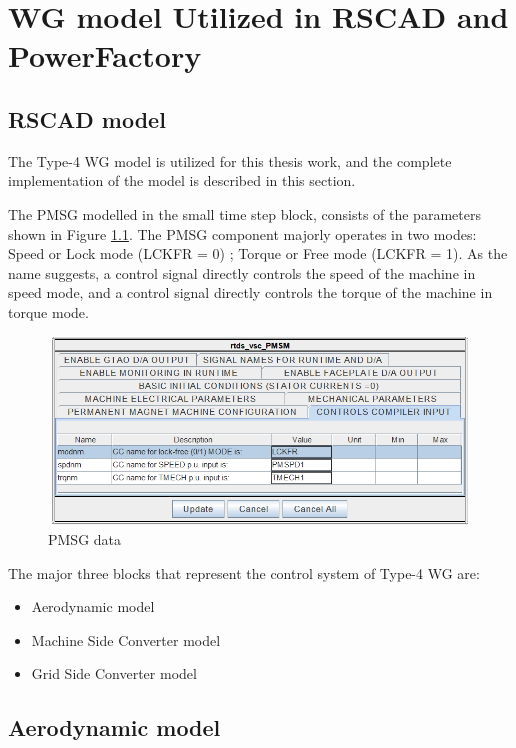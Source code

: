 \chapter{WG model Utilized in RSCAD and PowerFactory}\label{Appendix_A}

\section{RSCAD model}

The Type-4 \gls{WG} model is utilized for this thesis work, and the complete implementation of the model is described in this section. 

The \gls{PMSG} modelled in the small time step block, consists of the parameters shown in Figure \ref{fig:PMSG_block_para}. The \gls{PMSG} component majorly operates in two modes: Speed or Lock mode (LCKFR = 0) ; Torque or Free mode (LCKFR = 1).
As the name suggests, a control signal directly controls the speed of the machine in speed mode, and a control signal directly controls the torque of the machine in torque mode.  

\begin{figure}[H]
\centering
    \includegraphics[height = 5cm,width = 11.5cm]{Diagrams/Appendix_A/PMSG_block_para.PNG}
    \caption{PMSG data}
    \label{fig:PMSG_block_para}
\end{figure}

The major three blocks that represent the control system of Type-4 \gls{WG} are:
\begin{itemize}
    \item Aerodynamic model
    \item Machine Side Converter model
    \item Grid Side Converter model
\end{itemize}

\section{Aerodynamic model}

